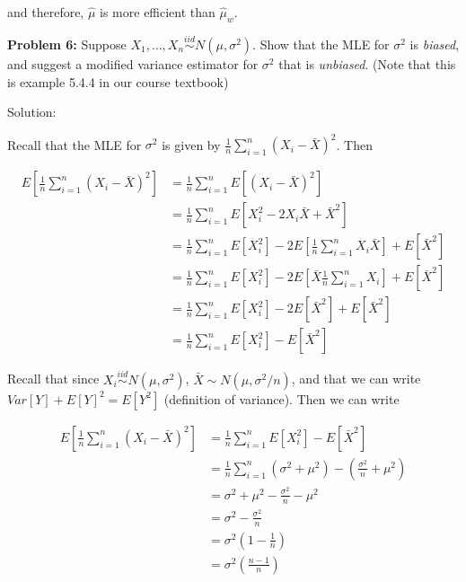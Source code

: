 \documentclass[
  letterpaper,
  DIV=11,
  numbers=noendperiod]{scrreprt}
\begin{document}
and therefore, \(\hat{\mu}\) is more efficient than \(\hat{\mu}_w\).

\textbf{Problem 6:} Suppose
\(X_1, \dots, X_n \overset{iid}{\sim} N(\mu, \sigma^2)\). Show that the
MLE for \(\sigma^2\) is \emph{biased}, and suggest a modified variance
estimator for \(\sigma^2\) that is \emph{unbiased}. (Note that this is
example 5.4.4 in our course textbook)

Solution:

Recall that the MLE for \(\sigma^2\) is given by
\(\frac{1}{n} \sum_{i = 1}^n (X_i - \bar{X})^2\). Then

\begin{align*}
    E\left[ \frac{1}{n} \sum_{i = 1}^n (X_i - \bar{X})^2\right] & = \frac{1}{n} \sum_{i = 1}^n E\left[ (X_i - \bar{X})^2\right] \\
    & = \frac{1}{n} \sum_{i = 1}^n E\left[ X_i^2 - 2X_i \bar{X} + \bar{X}^2\right] \\
    & = \frac{1}{n} \sum_{i = 1}^n E[X_i^2] - 2 E\left[ \frac{1}{n} \sum_{i = 1}^n X_i \bar{X} \right] + E[\bar{X}^2] \\
    & = \frac{1}{n} \sum_{i = 1}^n E[X_i^2] - 2 E\left[ \bar{X} \frac{1}{n} \sum_{i = 1}^n X_i  \right] + E[\bar{X}^2] \\
    & = \frac{1}{n} \sum_{i = 1}^n E[X_i^2] - 2 E\left[ \bar{X}^2  \right] + E[\bar{X}^2] \\
    & = \frac{1}{n} \sum_{i = 1}^n E[X_i^2] - E\left[ \bar{X}^2  \right] 
\end{align*}

Recall that since \(X_i \overset{iid}{\sim} N(\mu, \sigma^2)\),
\(\bar{X} \sim N(\mu, \sigma^2/n)\), and that we can write
\(Var[Y] + E[Y]^2 = E[Y^2]\) (definition of variance). Then we can write

\begin{align*}
    E\left[ \frac{1}{n} \sum_{i = 1}^n (X_i - \bar{X})^2 \right] & = \frac{1}{n} \sum_{i = 1}^n E[X_i^2] - E\left[ \bar{X}^2  \right] \\
    & = \frac{1}{n} \sum_{i = 1}^n \left( \sigma^2 + \mu^2 \right) - \left( \frac{\sigma^2}{n} + \mu^2 \right) \\
    & = \sigma^2 + \mu^2 - \frac{\sigma^2}{n} - \mu^2  \\
    & = \sigma^2 - \frac{\sigma^2}{n} \\
    & = \sigma^2 \left( 1 - \frac{1}{n} \right) \\
    & = \sigma^2  \left( \frac{n-1}{n} \right)
\end{align*}
\end{document}
